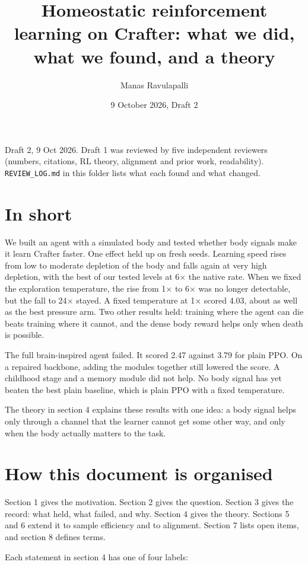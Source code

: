 \documentclass[11pt]{article}
\title{Homeostatic reinforcement learning on Crafter: what we did, what we found, and a theory}
\author{Manas Ravulapalli}
\date{9 October 2026, Draft 2}
\begin{document}
\maketitle

Draft 2, 9 Oct 2026. Draft 1 was reviewed by five independent reviewers (numbers, citations, RL theory, alignment and prior work, readability). \texttt{REVIEW\_LOG.md} in this folder lists what each found and what changed.

\section*{In short}

We built an agent with a simulated body and tested whether body signals make it learn Crafter faster. One effect held up on fresh seeds. Learning speed rises from low to moderate depletion of the body and falls again at very high depletion, with the best of our tested levels at 6$\times$ the native rate. When we fixed the exploration temperature, the rise from 1$\times$ to 6$\times$ was no longer detectable, but the fall to 24$\times$ stayed. A fixed temperature at 1$\times$ scored 4.03, about as well as the best pressure arm. Two other results held: training where the agent can die beats training where it cannot, and the dense body reward helps only when death is possible.

The full brain-inspired agent failed. It scored 2.47 against 3.79 for plain PPO. On a repaired backbone, adding the modules together still lowered the score. A childhood stage and a memory module did not help. No body signal has yet beaten the best plain baseline, which is plain PPO with a fixed temperature.

The theory in section 4 explains these results with one idea: a body signal helps only through a channel that the learner cannot get some other way, and only when the body actually matters to the task.

\section*{How this document is organised}

Section 1 gives the motivation. Section 2 gives the question. Section 3 gives the record: what held, what failed, and why. Section 4 gives the theory. Sections 5 and 6 extend it to sample efficiency and to alignment. Section 7 lists open items, and section 8 defines terms.

Each statement in section 4 has one of four labels:
\end{document}
